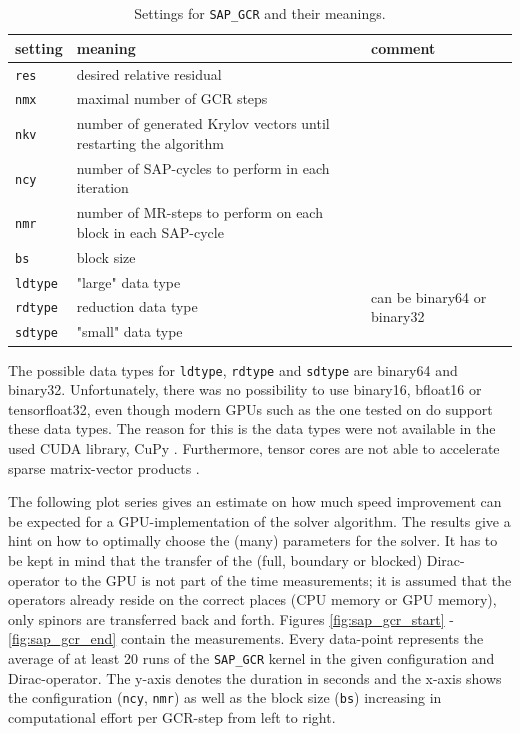 \documentclass{article}
\theoremstyle{plain} %
\theoremstyle{convention} %
\theoremstyle{remark} %
\def\code#1{\texttt{#1}}
\numberwithin{equation}{section}
\begin{document}
\begin{table}[H]
\centering
    \begin{tabular}{ |p{1.5cm}|p{6cm}|p{4.5cm}|  }
        \hline
        setting & meaning & comment \\
        \hline\hline
        \code{res}  & desired relative residual & \\
        \hline
        \code{nmx}  & maximal number of GCR steps & \\
        \hline
        \code{nkv}  & number of generated Krylov vectors until restarting the algorithm & \\
        \hline
        \code{ncy}  & number of SAP-cycles to perform in each iteration & \\
        \hline
        \code{nmr}  & number of MR-steps to perform on each block in each SAP-cycle & \\
        \hline
        \code{bs}   & block size & \\
        \hline
        \code{ldtype}  & "large" data type & \multirow{3}{*}{can be binary64 or binary32}  \\
        \cline{0-1}
        \code{rdtype}  & reduction data type & \\
        \cline{0-1}
        \code{sdtype}  & "small" data type & \\
        \hline
    \end{tabular}
    \caption{Settings for \code{SAP\_GCR} and their meanings.}
    \label{tab:sap_gcr_settings}
\end{table}

The possible data types for \code{ldtype}, \code{rdtype} and \code{sdtype} are \gls{binary64} and \gls{binary32}. Unfortunately, there was no possibility to use \gls{binary16}, \gls{bfloat16} or \gls{tensorfloat32}, even though modern GPUs such as the one tested on do support these data types. The reason for this is the data types were not available in the used CUDA library, CuPy \cite{cupy2017}. Furthermore, tensor cores are not able to accelerate sparse matrix-vector products \cite{choquette2021}.


The following plot series gives an estimate on how much speed improvement can be expected for a GPU-implementation of the solver algorithm. The results give a hint on how to optimally choose the (many) parameters for the solver. It has to be kept in mind that the transfer of the (full, boundary or blocked) Dirac-operator to the GPU is not part of the time measurements; it is assumed that the operators already reside on the correct places (CPU memory or GPU memory), only spinors are transferred back and forth. Figures \ref{fig:sap_gcr_start} - \ref{fig:sap_gcr_end} contain the measurements. Every data-point represents the average of at least \num{20} runs of the \code{SAP\_GCR} kernel in the given configuration and Dirac-operator. The y-axis denotes the duration in seconds and the x-axis shows the configuration (\code{ncy}, \code{nmr}) as well as the block size (\code{bs}) increasing in computational effort per GCR-step from left to right.
\end{document}
